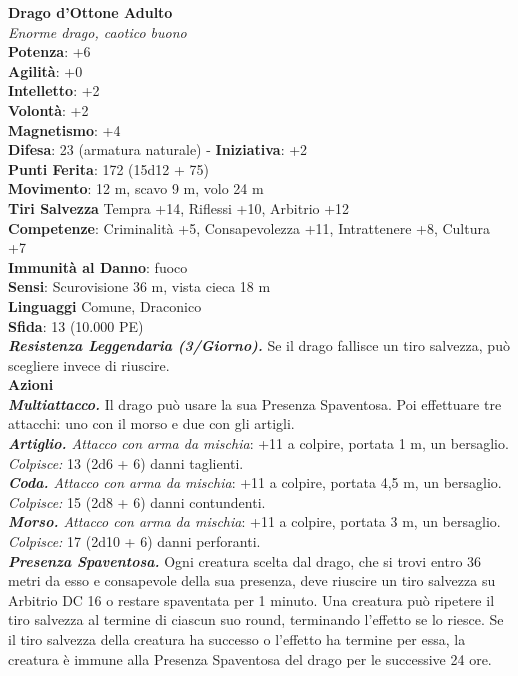 \begin{multicols}{2}
\medskip\textbf{Drago d'Ottone Adulto}\\
\emph{Enorme drago, caotico buono}\\
\textbf{Potenza}: +6\\
\textbf{Agilità}: +0\\
\textbf{Intelletto}: +2\\
\textbf{Volontà}: +2\\
\textbf{Magnetismo}: +4\\
\textbf{Difesa}: 23 (armatura naturale) - \textbf{Iniziativa}: +2\\
\textbf{Punti Ferita}: 172 (15d12 + 75)\\
\textbf{Movimento}: 12 m, scavo 9 m, volo 24 m\\
\textbf{Tiri Salvezza} Tempra +14, Riflessi +10, Arbitrio +12\\
\textbf{Competenze}: Criminalità +5, Consapevolezza +11, Intrattenere +8, Cultura +7\\
\textbf{Immunità al Danno}: fuoco\\
\textbf{Sensi}: Scurovisione 36 m, vista cieca 18 m\\
\textbf{Linguaggi} Comune, Draconico\\
\textbf{Sfida}: 13 (10.000 PE)\smallskip\\
\emph{\textbf{Resistenza Leggendaria (3/Giorno).}} Se il drago fallisce un tiro salvezza, può scegliere invece di riuscire.\\
\smallskip\textbf{Azioni}\\
\emph{\textbf{Multiattacco.}} Il drago può usare la sua Presenza Spaventosa. Poi effettuare tre attacchi: uno con il morso e due con gli artigli.\\
\emph{\textbf{Artiglio.} Attacco con arma da mischia}: +11 a colpire, portata 1 m, un bersaglio.\\
\emph{Colpisce:} 13 (2d6 + 6) danni taglienti.\\
\emph{\textbf{Coda.} Attacco con arma da mischia}: +11 a colpire, portata 4,5 m, un bersaglio.\\
\emph{Colpisce:} 15 (2d8 + 6) danni contundenti.\\
\emph{\textbf{Morso.} Attacco con arma da mischia}: +11 a colpire, portata 3 m, un bersaglio.\\
\emph{Colpisce:} 17 (2d10 + 6) danni perforanti.\\
\emph{\textbf{Presenza Spaventosa.}} Ogni creatura scelta dal drago, che si trovi entro 36 metri da esso e consapevole della sua presenza, deve riuscire un tiro salvezza su Arbitrio DC 16 o restare spaventata per 1 minuto. Una creatura può ripetere il tiro salvezza al termine di ciascun suo round, terminando l'effetto se lo riesce. Se il tiro salvezza della creatura ha successo o l'effetto ha termine per essa, la creatura è immune alla Presenza Spaventosa del drago per le successive 24 ore.\\

\end{multicols}
